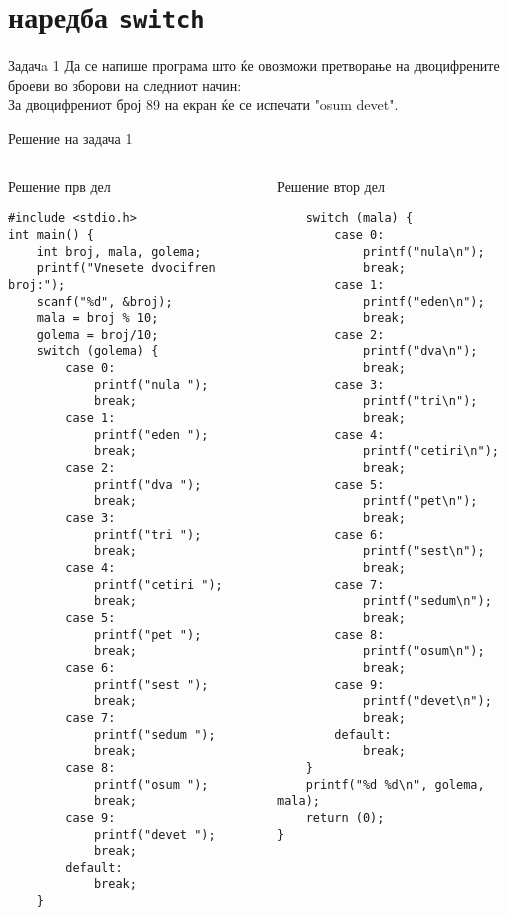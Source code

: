 \section{наредба \texttt{switch}}
\begin{frame}{Задачa 1}
Да се напише програма што ќе овозможи претворање на двоцифрените броеви во
зборови на следниот начин:\\
За двоцифрениот број 89 на екран ќе се испечати
"osum devet".
\end{frame}

\begin{frame}[t,fragile,shrink=35]{Решение на задача 1}
\begin{columns}
\begin{exampleblock}{Решение прв дел}
\begin{lstlisting}
#include <stdio.h>
int main() {
    int broj, mala, golema;
    printf("Vnesete dvocifren broj:");
    scanf("%d", &broj);
    mala = broj % 10;
    golema = broj/10;
    switch (golema) {
        case 0:
            printf("nula ");
            break;
        case 1:
            printf("eden ");
            break;
        case 2:
            printf("dva ");
            break;
        case 3:
            printf("tri ");
            break;
        case 4:
            printf("cetiri ");
            break;
        case 5:
            printf("pet ");
            break;
        case 6:
            printf("sest ");
            break;
        case 7:
            printf("sedum ");
            break;
        case 8:
            printf("osum ");
            break;
        case 9:
            printf("devet ");
            break;
        default:
            break;
    }
\end{lstlisting}
\end{exampleblock}
\begin{exampleblock}{Решение втор дел}
\begin{lstlisting}
    switch (mala) {
        case 0:
            printf("nula\n");
            break;
        case 1:
            printf("eden\n");
            break;
        case 2:
            printf("dva\n");
            break;
        case 3:
            printf("tri\n");
            break;
        case 4:
            printf("cetiri\n");
            break;
        case 5:
            printf("pet\n");
            break;
        case 6:
            printf("sest\n");
            break;
        case 7:
            printf("sedum\n");
            break;
        case 8:
            printf("osum\n");
            break;
        case 9:
            printf("devet\n");
            break;
        default:
            break;
    }
    printf("%d %d\n", golema, mala);
    return (0);
}
\end{lstlisting}
\end{exampleblock}
\end{columns}
\end{frame}


